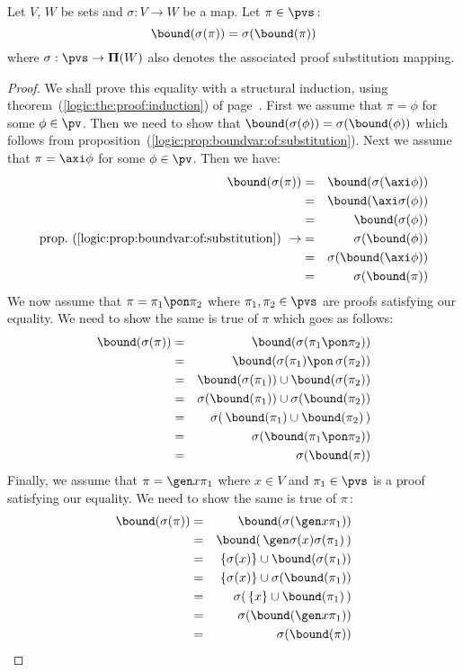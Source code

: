 \begin{prop}\label{logic:prop:FUAP:boundvarproof:substitution}
Let $V$, $W$ be sets and $\sigma:V\to W$ be a map. Let
$\pi\in\pvs$\,:
    \[
    \bound(\sigma(\pi))=\sigma(\bound(\pi))
    \]
where $\sigma:\pvs\to{\bf\Pi}(W)$ also denotes the associated proof
substitution mapping.
\end{prop}
\begin{proof}
We shall prove this equality with a structural induction, using
theorem~(\ref{logic:the:proof:induction}) of
page~\pageref{logic:the:proof:induction}. First we assume that
$\pi=\phi$ for some $\phi\in\pv$. Then we need to show that
$\bound(\sigma(\phi))=\sigma(\bound(\phi))$ which follows from
proposition~(\ref{logic:prop:boundvar:of:substitution}). Next we
assume that $\pi=\axi\phi$ for some $\phi\in\pv$. Then we have:
    \begin{eqnarray*}
    \bound(\sigma(\pi))&=&\bound(\sigma(\axi\phi))\\
    &=&\bound(\axi\sigma(\phi))\\
    &=&\bound(\sigma(\phi))\\
    \mbox{prop.~(\ref{logic:prop:boundvar:of:substitution})}\ \rightarrow
    &=&\sigma(\bound(\phi))\\
    &=&\sigma(\bound(\axi\phi))\\
    &=&\sigma(\bound(\pi))\\
    \end{eqnarray*}
We now assume that $\pi=\pi_{1}\pon\pi_{2}$ where
$\pi_{1},\pi_{2}\in\pvs$ are proofs satisfying our equality. We need
to show the same is true of $\pi$ which goes as follows:
    \begin{eqnarray*}
    \bound(\sigma(\pi))&=&\bound(\sigma(\pi_{1}\pon\pi_{2}))\\
    &=&\bound(\sigma(\pi_{1})\pon\,\sigma(\pi_{2}))\\
    &=&\bound(\sigma(\pi_{1}))\cup\bound(\sigma(\pi_{2}))\\
    &=&\sigma(\bound(\pi_{1}))\cup\sigma(\bound(\pi_{2}))\\
    &=&\sigma(\,\bound(\pi_{1})\cup\bound(\pi_{2})\,)\\
    &=&\sigma(\bound(\pi_{1}\pon\pi_{2}))\\
    &=&\sigma(\bound(\pi))\\
    \end{eqnarray*}
Finally, we assume that $\pi=\gen x\pi_{1}$ where $x\in V$ and
$\pi_{1}\in\pvs$ is a proof satisfying our equality. We need to show
the same is true of $\pi$\,:
    \begin{eqnarray*}
    \bound(\sigma(\pi))&=&\bound(\sigma(\gen x\pi_{1}))\\
    &=&\bound(\,\gen\sigma(x)\sigma(\pi_{1})\,)\\
    &=&\{\sigma(x)\}\cup\bound(\sigma(\pi_{1}))\\
    &=&\{\sigma(x)\}\cup\sigma(\bound(\pi_{1}))\\
    &=&\sigma(\,\{x\}\cup\bound(\pi_{1})\,)\\
    &=&\sigma(\bound(\gen x\pi_{1}))\\
    &=&\sigma(\bound(\pi))\\
    \end{eqnarray*}
\end{proof}

